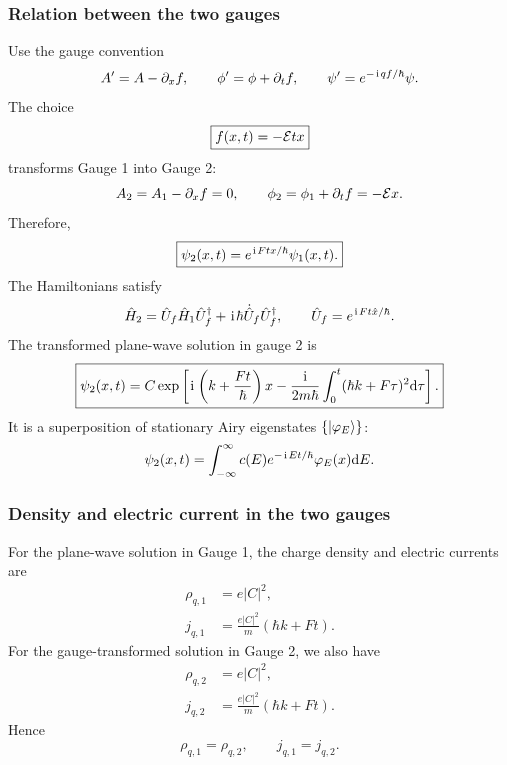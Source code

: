 \subsubsection{Relation between the two gauges}
Use the gauge convention
\begin{equation}
 A'=A-\partial_xf,
 \qquad \phi'=\phi+\partial_tf,
 \qquad \psi'=e^{-\hspace{1pt}\mathrm{i}\hspace{1pt} qf/\hbar}\psi.
\end{equation}
The choice
\begin{equation}
 \boxed{f(x,t)=-\mathcal{E} tx}
\end{equation}
transforms Gauge 1 into Gauge 2:
\begin{equation}
 A_2=A_1-\partial_xf=0,
 \qquad
 \phi_2=\phi_1+\partial_tf=-\mathcal{E} x.
\end{equation}
Therefore,
\begin{equation}
 \boxed{\psi_2(x,t)=e^{\hspace{1pt}\mathrm{i}\hspace{1pt} Ftx/\hbar}\psi_1(x,t).}
\end{equation}
The Hamiltonians satisfy
\begin{equation}
 \hat H_2=\hat U_f\hat H_1\hat U_f^\dagger
 +\hspace{1pt}\mathrm{i}\hspace{1pt}\hbar\dot{\hat U}_f\hat U_f^\dagger,
 \qquad
 \hat U_f=e^{\hspace{1pt}\mathrm{i}\hspace{1pt} Ft\hat x/\hbar}.
\end{equation}
The transformed plane-wave solution in gauge 2 is
\begin{equation}
 \boxed{
 \psi_2(x,t)=C
 \exp\left[
 \hspace{1pt}\mathrm{i}\hspace{1pt}\left(k+\frac{Ft}{\hbar}\right)x
 -\frac{\hspace{1pt}\mathrm{i}\hspace{1pt}}{2m\hbar}\int_0^t(\hbar k+F\tau)^2\mathrm{d}\tau
 \right].}
\end{equation}
It is a superposition of stationary Airy eigenstates $\{|{\varphi_E}\rangle\}$:
\begin{equation}
 \psi_2(x,t)=\int_{-\infty}^{\infty}
 c(E)e^{-\hspace{1pt}\mathrm{i}\hspace{1pt} Et/\hbar}\varphi_E(x)\mathrm{d} E.
\end{equation}

\subsubsection{Density and electric current in the two gauges}
For the plane-wave solution in Gauge 1, the charge density and electric currents are
\begin{align}
 \rho_{q,1}&=e|C|^2,\\
 j_{q,1}&=\frac{e|C|^2}{m}(\hbar k+Ft).
\end{align}
For the gauge-transformed solution in Gauge 2, we also have
\begin{align}
 \rho_{q,2}&=e|C|^2,\\
 j_{q,2}&=\frac{e|C|^2}{m}(\hbar k+Ft).
\end{align}
Hence
\begin{equation}
 \boxed{\rho_{q,1}=\rho_{q,2},
 \qquad j_{q,1}=j_{q,2}.}
\end{equation}

